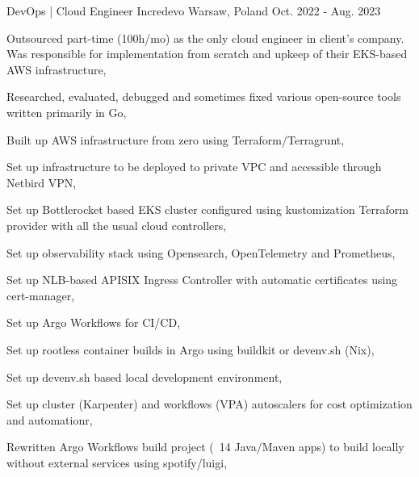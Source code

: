 

\begin{cventries}

    \cventry
    {DevOps | Cloud Engineer} %
    {Incredevo} %
    {Warsaw, Poland} %
    {Oct. 2022 - Aug. 2023} %
    {
        \begin{cvitems} %
            \item {Outsourced part-time (100h/mo) as the only cloud engineer in client's company. Was responsible for implementation from scratch and upkeep of their EKS-based AWS infrastructure,}
            \item {Researched, evaluated, debugged and sometimes fixed various open-source tools written primarily in Go,}
            \item {Built up AWS infrastructure from zero using Terraform/Terragrunt,}
            \item {Set up infrastructure to be deployed to private VPC and accessible through Netbird VPN,}
            \item {Set up Bottlerocket based EKS cluster configured using kustomization Terraform provider with all the usual cloud controllers,}
            \item {Set up observability stack using Opensearch, OpenTelemetry and Prometheus,}
            \item {Set up NLB-based APISIX Ingress Controller with automatic certificates using cert-manager,}
            \item {Set up Argo Workflows for CI/CD,}
            \item {Set up rootless container builds in Argo using buildkit or devenv.sh (Nix),}
            \item {Set up devenv.sh based local development environment,}
            \item {Set up cluster (Karpenter) and workflows (VPA) autoscalers for cost optimization and automationr,}
            \item {Rewritten Argo Workflows build project (~14 Java/Maven apps) to build locally without external services using spotify/luigi,}
        \end{cvitems}
    }


\end{cventries}

